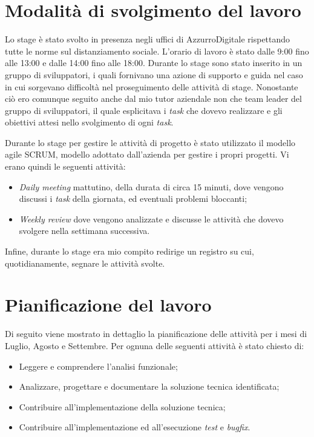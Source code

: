 \section{Modalità di svolgimento del lavoro}
Lo stage è stato svolto in presenza negli uffici di AzzurroDigitale rispettando tutte le norme sul distanziamento sociale. L'orario di lavoro è stato dalle 9:00 fino alle 13:00 e dalle 14:00 fino alle 18:00. Durante lo stage sono stato inserito in un gruppo di sviluppatori, i quali fornivano una azione di supporto e guida nel caso in cui sorgevano difficoltà nel proseguimento delle attività di stage. Nonostante ciò ero comunque seguito anche dal mio tutor aziendale non che team leader del gruppo di sviluppatori, il quale esplicitava i \emph{task} che dovevo realizzare e gli obiettivi attesi nello svolgimento di ogni \emph{task}. 

Durante lo stage per gestire le attività di progetto è stato utilizzato il modello agile \gls{SCRUM}\glsfirstoccur, modello adottato dall'azienda per gestire i propri progetti.
Vi erano quindi le seguenti attività:
\begin{itemize}
	\item \emph{Daily meeting} mattutino, della durata di circa 15 minuti, dove vengono discussi i \emph{task} della giornata, ed eventuali problemi bloccanti;
	\item \emph{Weekly review} dove vengono analizzate e discusse le attività che dovevo svolgere nella settimana successiva.
\end{itemize}

Infine, durante lo stage era mio compito redirige un registro su cui, quotidianamente, segnare le attività svolte.

\section{Pianificazione del lavoro}

Di seguito viene mostrato in dettaglio la pianificazione delle attività per i mesi di Luglio, Agosto e Settembre.
Per ognuna delle seguenti attività è stato chiesto di:
\begin{itemize}
	\item Leggere e comprendere l’analisi funzionale;
	\item Analizzare, progettare e documentare la soluzione tecnica identificata;
	\item Contribuire all’implementazione della soluzione tecnica;
	\item Contribuire all’implementazione ed all’esecuzione \emph{test} e \emph{bugfix}.
\end{itemize}

